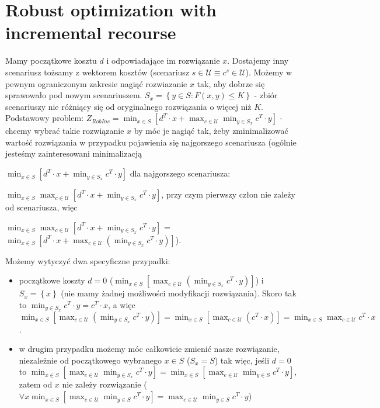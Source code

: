 \chapter{Robust optimization with incremental recourse}
\thispagestyle{chapterBeginStyle}

Mamy początkowe kosztu $d$ i odpowiadające im rozwiązanie $x$. Dostajemy inny scenariusz tożsamy z wektorem kosztów (scenariusz $s \in \mathcal{U} \equiv c^{s} \in \mathcal{U}$). Możemy w pewnym ograniczonym zakresie nagiąć rozwiazanie $x$ tak, aby dobrze się sprawowało pod nowym scenariuszem. $S_{x} = \left\{ y \in S : F \left( x, y \right) \leqslant K \right\}$ - zbiór scenariuszy nie różniący się od oryginalnego rozwiązania o więcej niż $K$. 
Podstawowy problem: $Z_{RobInc} = \min_{x \in S} \left[ d^T \cdot x + \max_{c \in \mathcal{U}} \min_{y \in S_{x}} c^T \cdot y \right]$ - chcemy wybrać takie rozwiązanie $x$ by móc je nagiąć tak, żeby zminimalizować wartość rozwiązania w przypadku pojawienia się najgorszego scenariusza (ogólnie jesteśmy zainteresowani minimalizacją 

$\min_{x \in S} \left[ d^T \cdot x + \min_{y \in S_{x}} c^T \cdot y \right]$ dla najgorszego scenariusza: 

$\min_{x \in S} \max_{c \in \mathcal{U}} \left[ d^T \cdot x + \min_{y \in S_{x}} c^T \cdot y \right]$, przy czym pierwszy człon nie zależy od scenariusza, więc 

$\min_{x \in S} \max_{c \in \mathcal{U}} \left[ d^T \cdot x + \min_{y \in S_{x}} c^T \cdot y \right]$ = $\min_{x \in S} \left[ d^T \cdot x + \max_{c \in \mathcal{U}} \left( \min_{y \in S_{x}} c^T \cdot y \right) \right]$).

Możemy wytyczyć dwa specyficzne przypadki:

\begin{itemize}
	\item początkowe  koszty $d = 0$ ($\min_{x \in S} \left[ \max_{c \in \mathcal{U}} \left( \min_{y \in S_{x}} c^T \cdot y \right) \right]$) i $S_{x} = \left\{ x \right\}$ (nie mamy żadnej możliwości modyfikacji rozwiązania). Skoro tak to $\min_{y \in S_{x}} c^T \cdot y = c^T \cdot x$, a więc $\min_{x \in S} \left[ \max_{c \in \mathcal{U}} \left( \min_{y \in S_{x}} c^T \cdot y \right) \right] = \min_{x \in S} \left[ \max_{c \in \mathcal{U}} \left( c^T \cdot x \right) \right] = \min_{x \in S} \max_{c \in \mathcal{U}} c^T \cdot x$.
	\item w drugim przypadku możemy móc całkowicie zmienić nasze rozwiązanie, niezależnie od początkowego wybranego $x \in S$ ($S_{x} = S$) tak więc, jeśli $d = 0$ to $\min_{x \in S} \left[ \max_{e \in \mathcal{U}} \min_{y \in S_{x}} c^T \cdot y \right] = \min_{x \in S} \left[ \max_{e \in \mathcal{U}} \min_{y \in S} c^T \cdot y \right]$, zatem od $x$ nie zależy rozwiązanie ($\forall x \min_{x \in S} \left[ \max_{e \in \mathcal{U}} \min_{y \in S} c^T \cdot y \right] = \max_{e \in \mathcal{U}} \min_{y \in S} c^T \cdot y$)
\end{itemize}

